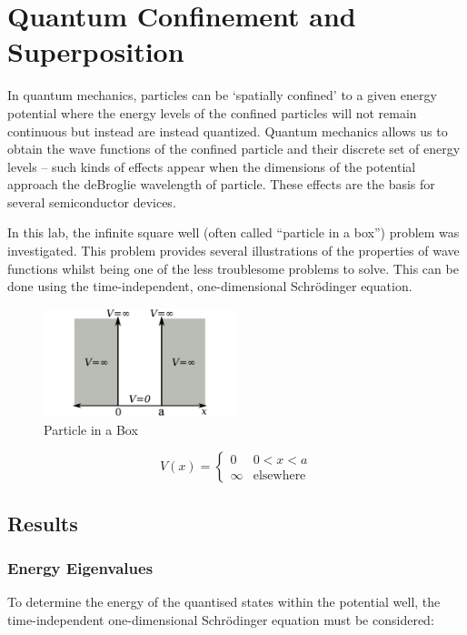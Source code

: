 \chapter{Quantum Confinement and Superposition}
In quantum mechanics, particles can be `spatially confined' to a given energy potential where the energy levels of the confined particles will not remain continuous but instead are instead quantized.
Quantum mechanics allows us to obtain the wave functions of the confined particle and their discrete set of energy levels -- such kinds of effects appear when the dimensions of the potential approach the deBroglie wavelength of particle. These effects are the basis for several semiconductor devices.

In this lab, the infinite square well (often called ``particle in a box'') problem was investigated. This problem provides several illustrations of the properties of wave functions whilst being one of the less troublesome problems to solve. This can be done using the time-independent, one-dimensional Schrödinger equation.

\begin{figure}[h]
    \centering
    \includegraphics[width=0.5\textwidth]{lab1/images/pIAB.png}
    \caption{Particle in a Box} %
    \label{fig:particleInABox}
\end{figure}

\[
  V(x) = \begin{cases}
  0 & 0 < x < a\\
  \infty & \text{elsewhere}
\end{cases}
\]
   
\section{Results}
\subsection{Energy Eigenvalues}
To determine the energy of the quantised states within the potential well, the time-independent one-dimensional Schrödinger equation must be considered:

